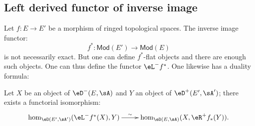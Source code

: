 \subsection{Left derived functor of inverse image}\label{VIII:6-3}

Let $f:E\to E'$ be a morphism of ringed topological spaces. The
inverse image functor:
\[
  f^\ast:\mathsf{Mod}(E') \to \mathsf{Mod}(E)
\]
is not necessarily exact. But one can define
$f^\ast$-flat objects and there are enough such objects. One can thus
define the functor $\eL^- f^\ast$. One likewise has a duality formula:

Let $X$ be an object of $\eD^-(E,\sA)$ and $Y$ an object of
$\eD^+(E',\sA')$; there exists a functorial isomorphism: 
\[\xymatrix{
  \hom_{\eD(E',\sA')}(\eL^- f^\ast(X),Y) \ar[r]^-\sim 
    & \hom_{\eD(E,\sA)}(X,\eR^+ f_\ast(Y)) \text{.}
}\]
















